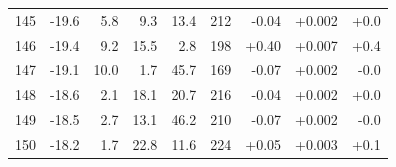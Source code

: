 \begin{longtable}{@{}r r r r r r r r r@{}}
145 & -19.6 & 5.8 & 9.3 & 13.4 & 212 & \cellcolor{green!15}-0.04 & \cellcolor{yellow!15}+0.002 & \cellcolor{orange!15}+0.0 \\
146 & -19.4 & 9.2 & 15.5 & 2.8 & 198 & \cellcolor{green!19}+0.40 & \cellcolor{yellow!18}+0.007 & \cellcolor{orange!17}+0.4 \\
147 & -19.1 & 10.0 & 1.7 & 45.7 & 169 & \cellcolor{green!15}-0.07 & \cellcolor{yellow!15}+0.002 & \cellcolor{orange!15}-0.0 \\
148 & -18.6 & 2.1 & 18.1 & 20.7 & 216 & \cellcolor{green!15}-0.04 & \cellcolor{yellow!15}+0.002 & \cellcolor{orange!15}+0.0 \\
149 & -18.5 & 2.7 & 13.1 & 46.2 & 210 & \cellcolor{green!15}-0.07 & \cellcolor{yellow!15}+0.002 & \cellcolor{orange!15}-0.0 \\
150 & -18.2 & 1.7 & 22.8 & 11.6 & 224 & \cellcolor{green!16}+0.05 & \cellcolor{yellow!16}+0.003 & \cellcolor{orange!16}+0.1 \\
\end{longtable}
